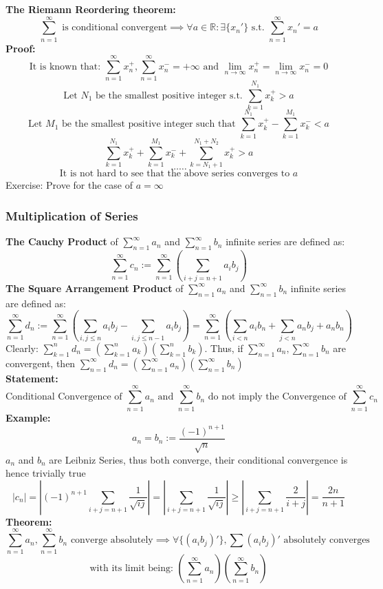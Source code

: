 \documentclass{article}
\newcommand{\st}{\mbox{ s.t. }}
\newcommand{\0}{{\bf{0}}}
\begin{document}
\textbf{The Riemann Reordering theorem:}
$$\sum_{n=1}^\infty\mbox{ is conditional convergent}\implies\forall a\in\mathbb{R}:\exists\{x_n'\}\mbox{ s.t. }\sum_{n=1}^\infty x_n'=a$$
\textbf{Proof:}
$$\mbox{It is known that: }\sum_{n=1}^\infty x_n^+,\sum_{n=1}^\infty x_n^-=+\infty\mbox{ and }\lim_{n\to\infty}x_n^+=\lim_{n\to\infty}x_n^-=0$$
$$\mbox{Let }N_1\mbox{ be the smallest positive integer}\st\sum_{k=1}^{N_1}x_k^+>a$$
$$\mbox{Let }M_1\mbox{ be the smallest positive integer such that }\sum_{k=1}^{N_1}x_k^+-\sum_{k=1}^{M_1}x_k^-<a$$
$$\sum_{k=1}^{N_1}x_k^++\sum_{k=1}^{M_1}x_k^-+\sum_{k=N_1+1}^{N_1+N_2}x_k^+>a$$
$$\dots\dots$$
$$\mbox{It is not hard to see that the above series converges to }a$$
\null\hfill{Exercise: Prove for the case of $a=\infty$}
\subsubsection{Multiplication of Series}
\textbf{The Cauchy Product} of $\sum\limits_{n=1}^\infty a_n$ and $\sum\limits_{n=1}^\infty b_n$ infinite series are defined as:
$$\sum_{n=1}^\infty c_n:=\sum_{n=1}^\infty\left(\sum_{i+j=n+1}a_ib_j\right)$$
\textbf{The Square Arrangement Product} of $\sum\limits_{n=1}^\infty a_n$ and $\sum\limits_{n=1}^\infty b_n$ infinite series are defined as:
$$\sum_{n=1}^\infty d_n:=\sum_{n=1}^\infty\left(\sum_{i,j\le n}a_ib_j-\sum_{i,j\le n-1}a_ib_j\right)=\sum_{n=1}^\infty\left(\sum_{i<n}a_ib_n+\sum_{j<n}a_nb_j+a_nb_n\right)$$
Clearly: $\sum\limits_{k=1}^nd_n=\left(\sum\limits_{k=1}^na_k\right)\left(\sum\limits_{k=1}^nb_k\right)$. Thus, if $\sum\limits_{n=1}^\infty a_n,\sum\limits_{n=1}^\infty b_n$ are convergent, then $\sum\limits_{n=1}^\infty d_n=\left(\sum\limits_{n=1}^\infty a_n\right)\left(\sum\limits_{n=1}^\infty b_n\right)$\\
\textbf{Statement:}
$$\mbox{Conditional Convergence of }\sum_{n=1}^\infty a_n\mbox{ and }\sum_{n=1}^\infty b_n\mbox{ do not imply the Convergence of }\sum_{n=1}^\infty c_n$$
\textbf{Example:}
$$a_n=b_n:=\frac{(-1)^{n+1}}{\sqrt{n}}$$
$a_n$ and $b_n$ are Leibniz Series, thus both converge, their conditional convergence is hence trivially true
$$|c_n|=\left|(-1)^{n+1}\sum_{i+j=n+1}\frac{1}{\sqrt{ij}}\right|=\left|\sum_{i+j=n+1}\frac{1}{\sqrt{ij}}\right|\geq\left|\sum_{i+j=n+1}\frac{2}{i+j}\right|=\frac{2n}{n+1}$$
\textbf{Theorem:}
$$\sum_{n=1}^\infty a_n,\sum_{n=1}^\infty b_n\mbox{ converge absolutely}\implies\forall\{(a_ib_j)'\},\sum (a_ib_j)'\mbox{ absolutely converges}$$ 
$$\mbox{with its limit being: }\left(\sum_{n=1}^\infty a_n\right)\left(\sum_{n=1}^\infty b_n\right)$$
\end{document}
